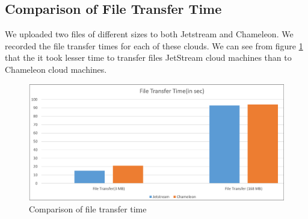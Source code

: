 \documentclass[9pt,twocolumn,twoside]{../../styles/osajnl}
\begin{document}
\subsection{Comparison of File Transfer Time}

We uploaded two files of different sizes to both Jetstream and Chameleon. We recorded the file transfer times for each of these clouds. We can see from figure \ref{fig:ftt} that the it took lesser time to transfer files JetStream cloud machines than to Chameleon cloud machines.

\begin{figure}[h]
	\centering
	\includegraphics[scale=0.33]{images/Filetransfer.png}
	\caption{Comparison of file transfer time}
	\label{fig:ftt}
\end{figure}
\end{document}
